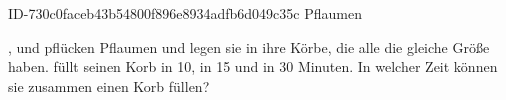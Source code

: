 \begin{exercise}
      {ID-730c0faceb43b54800f896e8934adfb6d049c35c}
      {Pflaumen}
  \ifproblem\problem\par
    \xya, \xxb{} und \xxc{} pflücken Pflaumen und legen sie in ihre Körbe, die
    alle die gleiche Größe haben. \xya{} füllt seinen Korb in 10, \xxb{} in 15
    und \xxc{} in 30 Minuten. In welcher Zeit können sie zusammen einen Korb
    füllen?
  \fi
\end{exercise}
